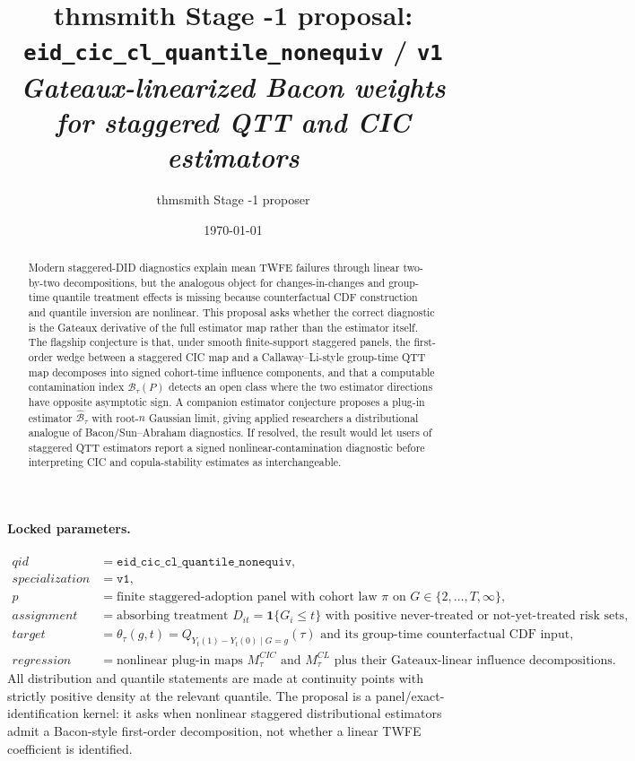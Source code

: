 \documentclass[11pt]{article}
\title{thmsmith Stage -1 proposal: \texttt{eid\_cic\_cl\_quantile\_nonequiv} / \texttt{v1}%
  \\ \large\textit{Gateaux-linearized Bacon weights for staggered QTT and CIC estimators}}
\author{thmsmith Stage -1 proposer}
\date{\today}
\newcommand{\one}{\mathbf{1}}
\theoremstyle{definition}
\theoremstyle{plain}
\theoremstyle{remark}
\begin{document}
\maketitle


\paragraph{Locked parameters.}
\[
\begin{array}{ll}
qid &= \texttt{eid\_cic\_cl\_quantile\_nonequiv},\\
specialization &= \texttt{v1},\\
p &= \text{finite staggered-adoption panel with cohort law }\pi\text{ on }G\in\{2,\ldots,T,\infty\},\\
assignment &= \text{absorbing treatment }D_{it}=\one\{G_i\le t\}\text{ with positive never-treated or not-yet-treated risk sets},\\
target &= \theta_\tau(g,t)=Q_{Y_t(1)-Y_t(0)\mid G=g}(\tau)\text{ and its group-time counterfactual CDF input},\\
regression &= \text{nonlinear plug-in maps }M_\tau^{CIC}\text{ and }M_\tau^{CL}\text{ plus their Gateaux-linear influence decompositions.}
\end{array}
\]
All distribution and quantile statements are made at continuity points with strictly positive density at the relevant quantile.  The proposal is a panel/exact-identification kernel: it asks when nonlinear staggered distributional estimators admit a Bacon-style first-order decomposition, not whether a linear TWFE coefficient is identified.

\begin{abstract}
Modern staggered-DID diagnostics explain mean TWFE failures through linear two-by-two decompositions, but the analogous object for changes-in-changes and group-time quantile treatment effects is missing because counterfactual CDF construction and quantile inversion are nonlinear.  This proposal asks whether the correct diagnostic is the Gateaux derivative of the full estimator map rather than the estimator itself.  The flagship conjecture is that, under smooth finite-support staggered panels, the first-order wedge between a staggered CIC map and a Callaway--Li-style group-time QTT map decomposes into signed cohort-time influence components, and that a computable contamination index \(\mathcal B_\tau(P)\) detects an open class where the two estimator directions have opposite asymptotic sign.  A companion estimator conjecture proposes a plug-in estimator \(\widehat{\mathcal B}_\tau\) with root-\(n\) Gaussian limit, giving applied researchers a distributional analogue of Bacon/Sun--Abraham diagnostics.  If resolved, the result would let users of staggered QTT estimators report a signed nonlinear-contamination diagnostic before interpreting CIC and copula-stability estimates as interchangeable.
\end{abstract}
\end{document}
